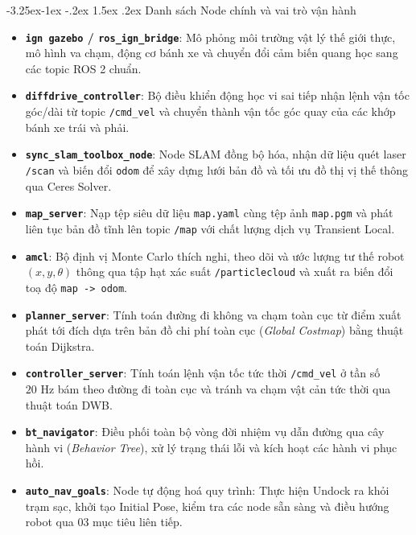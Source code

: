 \documentclass[11pt,a4paper]{article}
\makeatletter
\renewcommand{\subsection}{\@startsection{subsection}{2}{\z@}%
  {-3.25ex\@plus -1ex \@minus -.2ex}%
  {1.5ex \@plus .2ex}%
  {\normalfont\large\bfseries\color{secondary}}}
\makeatother
\begin{document}
\subsection{Danh sách Node chính và vai trò vận hành}
\begin{itemize}
  \item \textbf{\texttt{ign gazebo} / \texttt{ros\_ign\_bridge}}: Mô phỏng môi trường vật lý thế giới thực, mô hình va chạm, động cơ bánh xe và chuyển đổi cảm biến quang học sang các topic ROS 2 chuẩn.
  \item \textbf{\texttt{diffdrive\_controller}}: Bộ điều khiển động học vi sai tiếp nhận lệnh vận tốc góc/dài từ topic \texttt{/cmd\_vel} và chuyển thành vận tốc góc quay của các khớp bánh xe trái và phải.
  \item \textbf{\texttt{sync\_slam\_toolbox\_node}}: Node SLAM đồng bộ hóa, nhận dữ liệu quét laser \texttt{/scan} và biến đổi \texttt{odom} để xây dựng lưới bản đồ và tối ưu đồ thị vị thế thông qua Ceres Solver.
  \item \textbf{\texttt{map\_server}}: Nạp tệp siêu dữ liệu \texttt{map.yaml} cùng tệp ảnh \texttt{map.pgm} và phát liên tục bản đồ tĩnh lên topic \texttt{/map} với chất lượng dịch vụ Transient Local.
  \item \textbf{\texttt{amcl}}: Bộ định vị Monte Carlo thích nghi, theo dõi và ước lượng tư thế robot $(x, y, \theta)$ thông qua tập hạt xác suất \texttt{/particlecloud} và xuất ra biến đổi toạ độ \texttt{map -> odom}.
  \item \textbf{\texttt{planner\_server}}: Tính toán đường đi không va chạm toàn cục từ điểm xuất phát tới đích dựa trên bản đồ chi phí toàn cục (\textit{Global Costmap}) bằng thuật toán Dijkstra.
  \item \textbf{\texttt{controller\_server}}: Tính toán lệnh vận tốc tức thời \texttt{/cmd\_vel} ở tần số $20\text{ Hz}$ bám theo đường đi toàn cục và tránh va chạm vật cản tức thời qua thuật toán DWB.
  \item \textbf{\texttt{bt\_navigator}}: Điều phối toàn bộ vòng đời nhiệm vụ dẫn đường qua cây hành vi (\textit{Behavior Tree}), xử lý trạng thái lỗi và kích hoạt các hành vi phục hồi.
  \item \textbf{\texttt{auto\_nav\_goals}}: Node tự động hoá quy trình: Thực hiện Undock ra khỏi trạm sạc, khởi tạo Initial Pose, kiểm tra các node sẵn sàng và điều hướng robot qua 03 mục tiêu liên tiếp.
\end{itemize}
\end{document}
